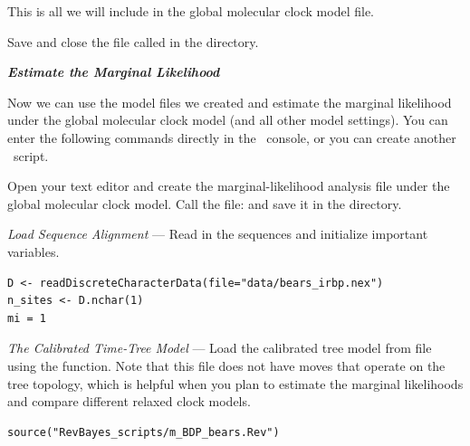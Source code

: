 This is all we will include in the global molecular clock model file. 

{\begin{framed}
Save and close the file called {\textcolor{red}{}} in the  directory.
\end{framed}}



%

\textbf{\textit{Estimate the Marginal Likelihood}}

Now we can use the model files we created and estimate the marginal likelihood under the global molecular clock model (and all other model settings). 
You can enter the following commands directly in the \RevBayes~console, or you can create another \Rev~script. 

{\begin{framed}
Open your text editor and create the marginal-likelihood analysis file under the global molecular clock model. Call the file: {\textcolor{red}{}} and save it in the  directory.
\end{framed}}


\textit{Load Sequence Alignment} --- Read in the sequences and initialize important variables.
{\tt \begin{snugshade*}
\begin{lstlisting}
D <- readDiscreteCharacterData(file="data/bears_irbp.nex")
n_sites <- D.nchar(1)
mi = 1
\end{lstlisting}
\end{snugshade*}}

\textit{The Calibrated Time-Tree Model} --- Load the calibrated tree model from file using the  function. Note that this file does not have moves that operate on the tree topology, which is helpful when you plan to estimate the marginal likelihoods and compare different relaxed clock models.
{\tt \begin{snugshade*}
\begin{lstlisting}
source("RevBayes_scripts/m_BDP_bears.Rev")
\end{lstlisting}
\end{snugshade*}}

